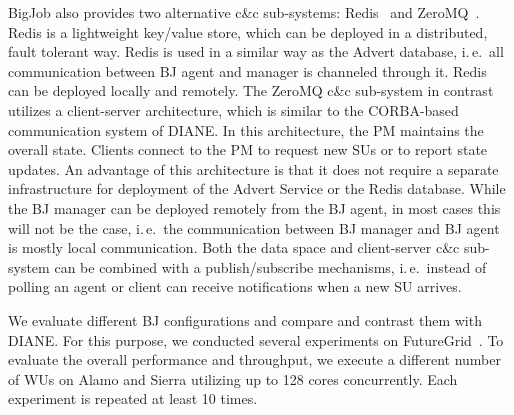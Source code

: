 \documentclass[conference,final]{IEEEtran}
\newcommand{\jhanote}[1]{ {\textcolor{red} { ***shantenu: #1 }}}
\newcommand{\alnote}[1]{ {\textcolor{blue} { ***andre: #1 }}}
\newcommand{\alnote}[1]{}
\newcommand{\jhanote}[1]{}
\begin{document}
BigJob also provides two alternative c\&c sub-systems:
Redis~\cite{redis} and ZeroMQ~\cite{zmq}. Redis is a lightweight
key/value store, which can be deployed in a distributed, fault
tolerant way. Redis is used in a similar way as the Advert database,
i.\,e.\ all communication between BJ agent and manager is channeled
through it. Redis can be deployed locally and remotely.  The ZeroMQ
c\&c sub-system in contrast utilizes a client-server architecture,
which is similar to the CORBA-based~\cite{OMG-CORBA303:2004}
communication system of DIANE. In this architecture, the PM maintains
the overall state. Clients connect to the PM to request new SUs or to
report state updates. An advantage of this architecture is that it
does not require a separate infrastructure for deployment of the
Advert Service or the Redis database. While the BJ manager can be
deployed remotely from the BJ agent, in most cases this will not be
the case, i.\,e.\ the communication between BJ manager and BJ agent is
mostly local communication. Both the data space and client-server c\&c
sub-system can be combined with a publish/subscribe mechanisms,
i.\,e.\ instead of polling an agent or client can receive
notifications when a new SU arrives. 

We evaluate different BJ configurations and compare and contrast them
with DIANE. For this purpose, we conducted several experiments on
FutureGrid~\cite{fg}. To evaluate the overall performance and
throughput, we execute a different number of WUs on Alamo and Sierra
utilizing up to 128 cores concurrently. Each experiment is repeated at
least 10 times.


\end{document}
